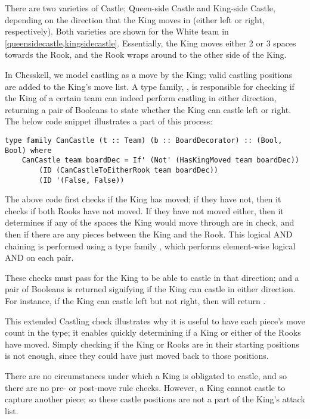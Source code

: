 There are two varieties of Castle; Queen-side Castle and King-side Castle, depending on the direction that the King moves in (either left or right, respectively). Both varieties are shown for the White team in \cref{queensidecastle,kingsidecastle}. Essentially, the King moves either 2 or 3 spaces towards the Rook, and the Rook wraps around to the other side of the King.

In Chesskell, we model castling as a move by the King; valid castling positions are added to the King's move list. A type family, , is responsible for checking if the King of a certain team can indeed perform castling in either direction, returning a pair of Booleans to state whether the King can castle left or right. The below code snippet illustrates a part of this process:

\begin{lstlisting}
type family CanCastle (t :: Team) (b :: BoardDecorator) :: (Bool, Bool) where
    CanCastle team boardDec = If' (Not' (HasKingMoved team boardDec))
        (ID (CanCastleToEitherRook team boardDec))
        (ID '(False, False))
\end{lstlisting}

The above code first checks if the King has moved; if they have not, then it checks if both Rooks have not moved. If they have not moved either, then it determines if any of the spaces the King would move through are in check, and then if there are any pieces between the King and the Rook. This logical AND chaining is performed using a type family , which performs element-wise logical AND on each pair.

These checks must pass for the King to be able to castle in that direction; and a pair of Booleans is returned signifying if the King can castle in either direction. For instance, if the King can castle left but not right, then  will return .

This extended Castling check illustrates why it is useful to have each piece's move count in the  type; it enables quickly determining if a King or either of the Rooks have moved. Simply checking if the King or Rooks are in their starting positions is not enough, since they could have just moved back to those positions.

There are no circumstances under which a King is obligated to castle, and so there are no pre- or post-move rule checks. However, a King cannot castle to capture another piece; so these castle positions are not a part of the King's attack list.

